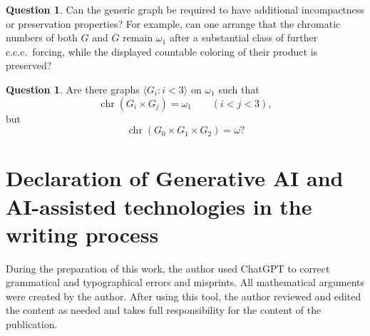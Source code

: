 \documentclass[10pt,a4paper]{amsart}
\numberwithin{equation}{section}
\theoremstyle{definition}
\newtheorem{question}[theorem]{Question}
\theoremstyle{remark}
\newcommand{\chr}{\operatorname{chr}}
\begin{document}
\begin{question}
Can the generic graph be required to have additional incompactness or
preservation properties?  For example, can one arrange that the
chromatic numbers of both $G$ and $\overline G$ remain $\omega_1$ after
a substantial class of further c.c.c.\ forcing, while the displayed
countable coloring of their product is preserved?
\end{question}


\begin{question}
Are there graphs $\langle G_i:i<3\rangle$ on $\omega_1$ such that
\begin{displaymath}
 \chr(G_i\times G_j)=\omega_1\qquad(i<j<3),
\end{displaymath}
but
\begin{displaymath}
 \chr(G_0\times G_1\times G_2)=\omega?
\end{displaymath}
\end{question}


\fi

\section*{Declaration of Generative AI and AI-assisted technologies in the writing process}

During the preparation of this work, the author used ChatGPT to
correct grammatical and typographical errors and misprints.  All
mathematical arguments were created by the author.  After using this
tool, the author reviewed and edited the content as needed and takes
full responsibility for the content of the publication.
\end{document}
